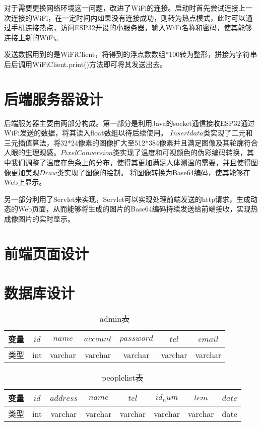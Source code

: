 对于需要更换网络环境这一问题，改进了WiFi的连接。启动时首先尝试连接上一次连接的WiFi，在一定时间内如果没有连接成功，则转为热点模式，此时可以通过手机连接热点，访问ESP32开设的小服务器，输入WiFi名称和密码，使其能够连接上新的WiFi。

发送数据用到的是WiFiClient，将得到的浮点数数组*100转为整形，拼接为字符串后后调用WiFiClient.print()方法即可将其发送出去。
\section{后端服务器设计}
后端服务器主要由两部分构成。第一部分是利用Java的socket通信接收ESP32通过WiFi发送的数据，将其读入float数组以待后续使用。
$Insertdata$类实现了二元和三元插值算法，将32*24像素的图像扩大至512*384像素并且满足图像及其轮廓符合人眼的生理观感。$PixelConversion$类实现了温度和可视颜色的伪彩编码转换，其中我们调整了温度在色条上的分布，使得其更加满足人体测温的需要，并且使得图像更加美观$Draw$类实现了图像的绘制。
将图像转换为Base64编码，使其能够在Web上显示。

另一部分利用了Servlet来实现，Servlet可以实现处理前端发送的http请求，生成动态的Web页面，从而能够将生成的图片的Base64编码持续发送给前端接收，实现热成像图片的实时显示。
\section{前端页面设计}
\section{数据库设计}
\begin{table}[htbp]
    \caption{admin表}\label{tab:table1}
    \vspace{0.5em}\centering\wuhao
    \begin{tabular}{ccccccc}
    \toprule[1.5pt]
    变量 & $id$ & $name$ & $account$&$password$ &$tel$&$email$\\
    \midrule[1pt]
    类型& int & varchar & varchar&varchar&varchar&varchar\\
    \bottomrule[1.5pt]
    \end{tabular}
    \vspace{\baselineskip}
    \end{table}
    
    \begin{table}[htbp]
        \caption{peoplelist表}\label{tab:table2}
        \vspace{0.5em}\centering\wuhao
        \begin{tabular}{cccccccc}
        \toprule[1.5pt]
        变量 & $id$&$address$ & $name$ & $tel$&$id_num$ &$tem$&$date$\\
        \midrule[1pt]
        类型& int & varchar & varchar&varchar&varchar&varchar&date\\
        \bottomrule[1.5pt]
        \end{tabular}
        \vspace{\baselineskip}
        \end{table}